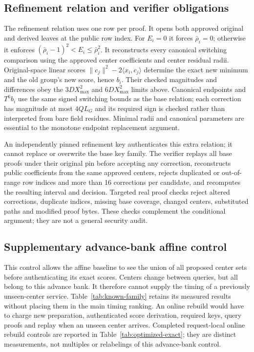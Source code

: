 \subsection{Refinement relation and verifier obligations}
The refinement relation uses one row per proof. It opens both approved
original and derived leaves at the public row index. For $E_i=0$ it forces
$\bar\rho_i=0$; otherwise it enforces
$(\bar\rho_i-1)^2<E_i\leq\bar\rho_i^2$. It reconstructs every canonical
switching comparison using the approved center coefficients and center
residual radii. Original-space linear scores
$\|c_j\|^2-2\langle x_i,c_j\rangle$ determine the exact new minimum and
the old group's new score, hence $b_i$. Their checked magnitudes and
differences obey the $3DX_{\max}^2$ and $6DX_{\max}^2$ limits above. Canonical endpoints
and $T^6b_i$ use the same signed switching bounds as the base relation;
each correction has magnitude at most $4QL_G$ and its required sign is
checked rather than interpreted from bare
field residues. Minimal radii and canonical parameters are essential to
the monotone endpoint replacement argument.

An independently pinned refinement key authenticates this extra relation;
it cannot replace or overwrite the base key family. The verifier replays
all base proofs under their original pin before accepting any correction,
reconstructs public coefficients from the same approved centers, rejects
duplicated or out-of-range row indices and more than 16 corrections per
candidate, and recomputes the resulting interval and decision. Targeted real
proof checks reject altered corrections, duplicate indices, missing base
coverage, changed centers, substituted paths and modified proof bytes.
These checks complement the conditional argument; they are not a general
security audit.

\subsection{Supplementary advance-bank affine control}\label{sec:known-family-results}
This control allows the affine baseline to see the union of all proposed
center sets before authenticating its exact scores. Centers change between
queries, but all belong to this advance bank. It therefore cannot supply the
timing of a previously unseen-center service. Table~\ref{tab:known-family}
retains its measured results without placing them in the main timing ranking.
An online rebuild would have to charge new preparation, authenticated score
derivation, required keys, query proofs and replay when an unseen center
arrives. Completed request-local online rebuild controls are reported in
Table~\ref{tab:optimized-exact}; they are distinct measurements, not multiples
or relabelings of this advance-bank control.


